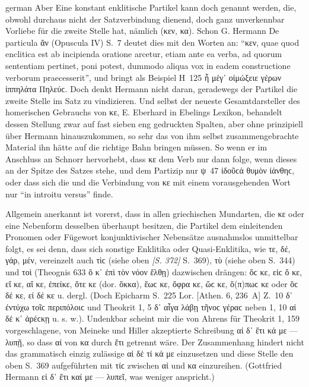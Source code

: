 \begin{otherlanguage*}{german}
Aber Eine konstant enklitische Partikel kann doch genannt werden, die, obwohl durchaus nicht der Satzverbindung dienend, doch ganz unverkennbar Vorliebe für die zweite Stelle hat, nämlich  (κεν, κα). Schon G. Hermann De particula ἄν (Opuscula IV) S.~7 deutet dies mit den Worten an: “κεν, quae quod enclitica est ab incipienda oratione arcetur, etiam ante ea verba, ad quorum sententiam pertinet, poni potest, dummodo aliqua vox in eadem constructione verborum praecesserit”, und bringt als Beispiel Η~125 ἦ  μέγ᾽ οἰμώξειε γέρων ἱππηλάτα Πηλεύϲ. Doch denkt Hermann nicht daran, geradewegs der Partikel die zweite Stelle im Satz zu vindizieren. Und selbst der neueste Gesamtdarsteller des homerischen Gebrauchs von κε, Ε. Eberhard in Ebelings Lexikon, behandelt dessen Stellung zwar auf fast sieben eng gedruckten Spalten, aber ohne prinzipiell über Hermann hinauszukommen, so sehr das von ihm selbst zusammengebrachte Material ihn hätte auf die richtige Bahn bringen müssen. So wenn er im Anschluss an Schnorr hervorhebt, dass κε dem Verb nur dann folge, wenn dieses an der Spitze des Satzes stehe, und dem Partizip nur ψ~47 ἰδοῦϲά  θυμὸν ἰάνθηϲ, oder dass sich die und die Verbindung von κε mit einem vorausgehenden Wort nur “in introitu versus” finde.

Allgemein anerkannt ist vorerst, dass in allen griechischen Mundarten, die κε oder eine Nebenform desselben überhaupt besitzen, die Partikel dem einleitenden Pronomen oder Fügewort konjunktivischer Nebensätze ausnahmslos unmittelbar folgt, es sei denn, dass sich sonstige Enklitika oder Quasi-Enklitika, wie τε, δέ, γάρ, μέν, vereinzelt auch τὶϲ (siehe oben \hypertarget{p372}{\emph{[S. 372]}}\label{p372} S.~369), τὺ (siehe oben S.~344) und τοὶ (Theognis 633 ὅ  κ᾽ ἐπὶ τὸν νόον ἔλθῃ) dazwischen drängen: ὅϲ κε, εἰϲ ὅ κε, εἴ κε, αἴ κε, ἐπείκε, ὅτε κε (dor. ὅκκα), ἕωϲ κε, ὄφρα κε, ὥϲ κε, ὅ(π)πωϲ κε oder ὃϲ δέ κε, εἰ δέ κε u. dergl. (Doch Epicharm S.~225 Lor. [Athen. 6, 236~A] Z.~10  δ᾽ ἐντύχω τοῖϲ περιπόλοιϲ und Theokrit 1, 5  δ᾽ αἶγα λάβῃ τῆνοϲ γέραϲ neben 1, 10 αἰ δέ κ᾽ ἀρέϲκῃ u. s. w.). Undenkbar scheint mir die von Ahrens für Theokrit 1, 159 vorgeschlagene, von Meineke und Hiller akzeptierte Schreibung αἰ δ᾽ ἔτι κά με — λυπῇ, so dass αἰ von κα durch ἔτι getrennt wäre. Der Zusammenhang hindert nicht das grammatisch einzig zulässige αἰ δέ τί κά με einzusetzen und diese Stelle den oben S.~369 aufgeführten mit τίϲ zwischen αἰ und κα einzureihen. (Gottfried Hermann εἰ δ᾽ ἔτι καί με — λυπεῖ, was weniger anspricht.)


\end{otherlanguage*}
